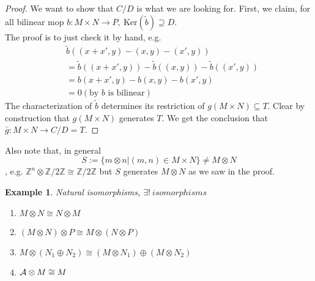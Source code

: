 \documentclass[11pt]{article}
\newtheorem{ex}[thm]{Example}
\newcommand{\intg}{\mathbb Z}
\newcommand{\cala}{{\cal A}}
\newcommand{\rta}{\rightarrow}
\begin{document}
\begin{proof}
We want to show that $C/D$ is what we are looking for. First, we claim, for all bilinear mop $ b:M\times N\rta P,\ \text{Ker}(\tilde{b})\supseteq D$.\\
The proof is to just check it by hand, e.g.
$$
\begin{aligned}
&\tilde{b}((x+x',y)-(x,y)-(x',y))\\
&=\tilde{b}((x+x',y))-\tilde{b}((x,y))-\tilde{b}((x',y))\\
&=b(x+x',y)-b(x,y)-b(x',y)\\
&=0(\text{by $b$ is bilinear})
\end{aligned}
$$
The characterization of $\tilde{b}$ determines its restriction of $g(M\times N)\subseteq T$. Clear by construction that $g(M\times N)$ generates $T$. We get the conclusion that $\bar{g}:M\times N\rta C/D=T$.
\end{proof}
Also note that, in general
$$
S:=\{m\otimes n|(m,n)\in M\times N\}\neq M\otimes N
$$, e.g. $\intg^n\otimes \intg/2\intg\cong \intg/2\intg$
but $S$ generates $M\otimes N$ as we saw in the proof.
\begin{ex}
Natural isomorphisms, $\exists !\ isomorphisms$
\begin{enumerate}
\item $M\otimes N\cong N\otimes M$
\item $(M\otimes N)\otimes P\cong M\otimes (N\otimes P)$
\item $M\otimes (N_1\oplus N_2)\cong (M\otimes N_1)\oplus (M\otimes N_2)$
\item $\cala\otimes M\cong M$
\end{enumerate}
\end{ex}
\end{document}

